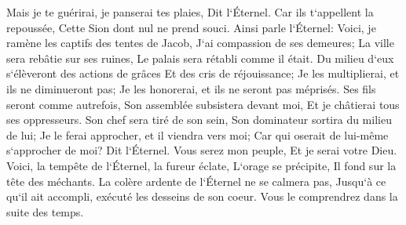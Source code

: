 \verse Mais je te guérirai, je panserai tes plaies, Dit l`Éternel. Car ils t`appellent la repoussée, Cette Sion dont nul ne prend souci. 
\verse Ainsi parle l`Éternel: Voici, je ramène les captifs des tentes de Jacob, J`ai compassion de ses demeures; La ville sera rebâtie sur ses ruines, Le palais sera rétabli comme il était. 
\verse Du milieu d`eux s`élèveront des actions de grâces Et des cris de réjouissance; Je les multiplierai, et ils ne diminueront pas; Je les honorerai, et ils ne seront pas méprisés. 
\verse Ses fils seront comme autrefois, Son assemblée subsistera devant moi, Et je châtierai tous ses oppresseurs. 
\verse Son chef sera tiré de son sein, Son dominateur sortira du milieu de lui; Je le ferai approcher, et il viendra vers moi; Car qui oserait de lui-même s`approcher de moi? Dit l`Éternel. 
\verse Vous serez mon peuple, Et je serai votre Dieu. 
\verse Voici, la tempête de l`Éternel, la fureur éclate, L`orage se précipite, Il fond sur la tête des méchants. 
\verse La colère ardente de l`Éternel ne se calmera pas, Jusqu`à ce qu`il ait accompli, exécuté les desseins de son coeur. Vous le comprendrez dans la suite des temps. 

